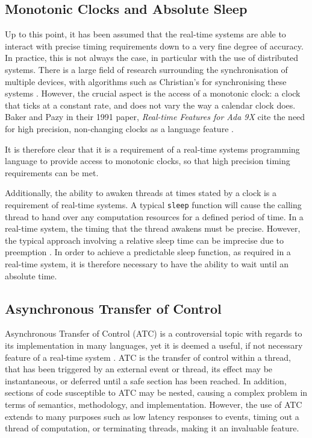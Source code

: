 \subsection{Monotonic Clocks and Absolute Sleep}
Up to this point, it has been assumed that the real-time systems are able to 
interact with precise timing requirements down to a very fine degree of accuracy.
In practice, this is not always the case, in particular with the use of 
distributed systems. There is a large field of research surrounding the 
synchronisation of multiple devices, with algorithms such as Christian's for 
synchronising these systems \cite{37958}. However, the crucial aspect is the 
access of a monotonic clock: a clock that ticks at a constant rate, and does not 
vary the way a calendar clock does. Baker and Pazy in their 1991 paper, \emph{
Real-time Features for Ada 9X} cite the need for high precision, non-changing 
clocks as a language feature \cite{160371}. 
\par\bigskip\noindent
It is therefore clear that it is a requirement of a real-time systems programming 
language to provide access to monotonic clocks, so that high precision timing 
requirements can be met. 
\par\bigskip\noindent
Additionally, the ability to awaken threads at times stated by a clock is a 
requirement of real-time systems. A typical \texttt{sleep} function will cause 
the calling thread to hand over any computation resources for a defined period of time. 
In a real-time system, the timing that the thread awakens must be precise. 
However, the typical approach involving a relative sleep time can be imprecise 
due to preemption \cite{real-time-systems}. In order to achieve a predictable 
sleep function, as required in a real-time system, it is therefore necessary 
to have the ability to wait until an absolute time.  

\subsection{Asynchronous Transfer of Control}
Asynchronous Transfer of Control (ATC) is a controversial topic with regards to its 
implementation in many languages, yet it is deemed a useful, if not necessary 
feature of a real-time system 
\cite{atc-article}. 
ATC is the transfer 
of control within a thread, that has been triggered by an external event or thread, 
its effect may be instantaneous, or deferred until a safe section has been reached. 
In addition, sections of code susceptible to ATC may be nested, causing a 
complex problem in terms of semantics, methodology, and implementation. 
However, the use of ATC extends to many purposes such as low latency responses to events, timing 
out a thread of computation, or terminating threads, making it an invaluable feature. 

